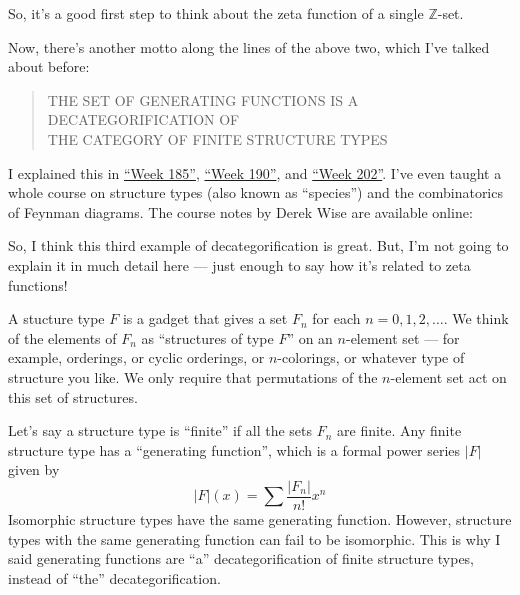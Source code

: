 \documentclass{article}
\def\tightlist{}
\renewcommand{\texttt}[1]{%
  \begingroup
  \ttfamily
  \begingroup\lccode`~=`/\lowercase{\endgroup\def~}{/\discretionary{}{}{}}%
  \begingroup\lccode`~=`[\lowercase{\endgroup\def~}{[\discretionary{}{}{}}%
  \begingroup\lccode`~=`.\lowercase{\endgroup\def~}{.\discretionary{}{}{}}%
  \catcode`/=\active\catcode`[=\active\catcode`.=\active
  \scantokens{#1\noexpand}%
  \endgroup
}
\begin{document}
So, it's a good first step to think about the zeta function of a single
\(\mathbb{Z}\)-set.

Now, there's another motto along the lines of the above two, which I've
talked about before:

\begin{quote}
THE SET OF GENERATING FUNCTIONS IS A DECATEGORIFICATION OF\\
THE CATEGORY OF FINITE STRUCTURE TYPES
\end{quote}

I explained this in \protect\hyperlink{week185}{``Week 185''},
\protect\hyperlink{week190}{``Week 190''}, and
\protect\hyperlink{week202}{``Week 202''}. I've even taught a whole
course on structure types (also known as ``species'') and the
combinatorics of Feynman diagrams. The course notes by Derek Wise are
available online:


So, I think this third example of decategorification is great. But, I'm
not going to explain it in much detail here --- just enough to say how
it's related to zeta functions!

A stucture type \(F\) is a gadget that gives a set \(F_n\) for each
\(n = 0,1,2,\ldots\). We think of the elements of \(F_n\) as
``structures of type \(F\)'' on an \(n\)-element set --- for example,
orderings, or cyclic orderings, or \(n\)-colorings, or whatever type of
structure you like. We only require that permutations of the
\(n\)-element set act on this set of structures.

Let's say a structure type is ``finite'' if all the sets \(F_n\) are
finite. Any finite structure type has a ``generating function'', which
is a formal power series \(|F|\) given by
\[|F|(x) = \sum \frac{|F_n|}{n!}x^n\] Isomorphic structure types have
the same generating function. However, structure types with the same
generating function can fail to be isomorphic. This is why I said
generating functions are ``a'' decategorification of finite structure
types, instead of ``the'' decategorification.
\end{document}
